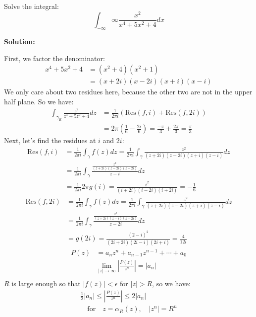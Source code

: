 \begin{example}
    Solve the integral:
    $$\int_{-\infty}{\infty} \frac{x^2}{x^4 + 5x^2 + 4} dx$$

    \textbf{Solution:}

    First, we factor the denominator:
    \begin{align*}
        x^4 + 5x^2 + 4 & = (x^2 + 4)(x^2 + 1)             \\
                       & = (x + 2i)(x - 2i)(x + i)(x - i)
    \end{align*}
    We only care about two residues here, because the other two are not in the upper half plane. So we have:
    \begin{align*}
        \int_{\gamma_R}\frac{z^2}{z^4 + 5z^2 + 4} dz & = \frac{1}{2\pi i}(\text{Res}(f, i) + \text{Res}(f, 2i))                              \\
                                                     & = 2\pi (\frac{1}{6} - \frac{2i}{6}) = \frac{-\pi}{3} + \frac{2\pi}{3} = \frac{\pi}{3}
    \end{align*}
    Next, let's find the residues at $i$ and $2i$:
    \begin{align*}
        \text{Res}(f, i) & = \frac{1}{2\pi i}\int_{\gamma} f(z) dz = \frac{1}{2\pi i}\int_{\gamma} \frac{z^2}{(z + 2i)(z - 2i)(z + i)(z - i)} dz \\
                         & = \frac{1}{2\pi i}\int_{\gamma} \frac{\frac{z^2}{(z + 2i)(z - 2i)(z+2i)}}{z-i}dz                                      \\
                         & = \frac{1}{2\pi i}2\pi g(i) = \frac{i^2}{(i + 2i)(i - 2i)(i + 2i)} = -\frac{1}{6}
    \end{align*}
    \begin{align*}
        \text{Res}(f, 2i) & = \frac{1}{2\pi i}\int_{\gamma} f(z) dz = \frac{1}{2\pi i}\int_{\gamma} \frac{z^2}{(z + 2i)(z - 2i)(z + i)(z - i)} dz \\
                          & = \frac{1}{2\pi i}\int_{\gamma} \frac{\frac{z^2}{(z + 2i)(z - i)(z+2i)}}{z-2i}dz                                      \\
                          & = g(2 i)  = \frac{(2 - i)^2}{(2i + 2i)(2i - i)(2i + i)} = \frac{4}{12i}
    \end{align*}
    \begin{align*}
        P(z) & = a_nz^n + a_{n-1}z^{n-1} + \cdots + a_0                      \\
             & \lim_{|z| \to \infty} \left| \frac{P(z)}{z^n} \right| = |a_n| \\
    \end{align*}
    $R$ is large enough so that $|f(z)| < \epsilon$ for $|z| > R$, so we have:
    \begin{align*}
        \frac{1}{2} |a_n| \leq \left|\frac{P(z)}{z^n}\right| \leq 2|a_n| \\ \quad \text{for} \quad z = \alpha_R (z), \quad |z^n| = R^n \\
    \end{align*}


\end{example}
